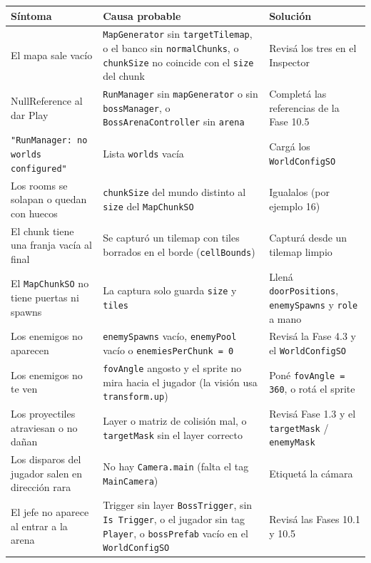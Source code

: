 \documentclass[a4paper,12pt]{article}
\newcommand{\code}[1]{\texttt{#1}}
\begin{document}
\begin{center}
\begin{longtable}{|p{4.2cm}|p{4.6cm}|p{5.4cm}|}
\hline
\textbf{Síntoma} & \textbf{Causa probable} & \textbf{Solución} \\
\hline
\endhead
El mapa sale vacío & \code{MapGenerator} sin \code{targetTilemap}, o el banco sin \code{normalChunks}, o \code{chunkSize} no coincide con el \code{size} del chunk & Revisá los tres en el Inspector \\
\hline
NullReference al dar Play & \code{RunManager} sin \code{mapGenerator} o sin \code{bossManager}, o \code{BossArenaController} sin \code{arena} & Completá las referencias de la Fase 10.5 \\
\hline
\code{"RunManager: no worlds configured"} & Lista \code{worlds} vacía & Cargá los \code{WorldConfigSO} \\
\hline
Los rooms se solapan o quedan con huecos & \code{chunkSize} del mundo distinto al \code{size} del \code{MapChunkSO} & Igualalos (por ejemplo 16) \\
\hline
El chunk tiene una franja vacía al final & Se capturó un tilemap con tiles borrados en el borde (\code{cellBounds}) & Capturá desde un tilemap limpio \\
\hline
El \code{MapChunkSO} no tiene puertas ni spawns & La captura solo guarda \code{size} y \code{tiles} & Llená \code{doorPositions}, \code{enemySpawns} y \code{role} a mano \\
\hline
Los enemigos no aparecen & \code{enemySpawns} vacío, \code{enemyPool} vacío o \code{enemiesPerChunk = 0} & Revisá la Fase 4.3 y el \code{WorldConfigSO} \\
\hline
Los enemigos no te ven & \code{fovAngle} angosto y el sprite no mira hacia el jugador (la visión usa \code{transform.up}) & Poné \code{fovAngle = 360}, o rotá el sprite \\
\hline
Los proyectiles atraviesan o no dañan & Layer o matriz de colisión mal, o \code{targetMask} sin el layer correcto & Revisá Fase 1.3 y el \code{targetMask} / \code{enemyMask} \\
\hline
Los disparos del jugador salen en dirección rara & No hay \code{Camera.main} (falta el tag \code{MainCamera}) & Etiquetá la cámara \\
\hline
El jefe no aparece al entrar a la arena & Trigger sin layer \code{BossTrigger}, sin \code{Is Trigger}, o el jugador sin tag \code{Player}, o \code{bossPrefab} vacío en el \code{WorldConfigSO} & Revisá las Fases 10.1 y 10.5 \\

\end{longtable}
\end{center}
\end{document}
